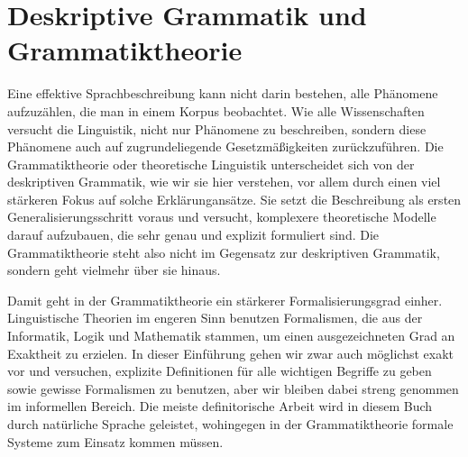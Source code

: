 \section{Deskriptive Grammatik und Grammatiktheorie}

\label{sec:deskriptivtheoretisch}

Eine effektive Sprachbeschreibung kann nicht darin bestehen, alle Phänomene aufzuzählen, die man \zB in einem Korpus beobachtet.
Wie alle Wissenschaften versucht die Linguistik, nicht nur Phänomene zu beschreiben, sondern diese Phänomene auch auf zugrundeliegende Gesetzmäßigkeiten zurückzuführen.
Die Grammatiktheorie oder theoretische Linguistik unterscheidet sich von der deskriptiven Grammatik, wie wir sie hier verstehen, vor allem durch einen viel stärkeren Fokus auf solche Erklärungansätze.
Sie setzt die Beschreibung als ersten Generalisierungsschritt voraus und versucht, komplexere theoretische Modelle darauf aufzubauen, die sehr genau und explizit formuliert sind.
Die Grammatiktheorie steht also nicht im Gegensatz zur deskriptiven Grammatik, sondern geht vielmehr über sie hinaus.

Damit geht in der Grammatiktheorie ein stärkerer Formalisierungsgrad einher.
Linguistische Theorien im engeren Sinn benutzen Formalismen, die aus der Informatik, Logik und Mathematik stammen, um einen ausgezeichneten Grad an Exaktheit zu erzielen.
In dieser Einführung gehen wir zwar auch möglichst exakt vor und versuchen, explizite Definitionen für alle wichtigen Begriffe zu geben sowie gewisse Formalismen zu benutzen, aber wir bleiben dabei streng genommen im informellen Bereich.
Die meiste definitorische Arbeit wird in diesem Buch durch natürliche Sprache geleistet, wohingegen in der Grammatiktheorie formale Systeme zum Einsatz kommen müssen.

\Zusammenfassung

